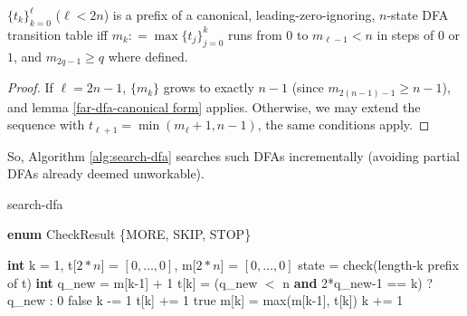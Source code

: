 \begin{corollary}\normalfont
  $\{t_k\}_{k=0}^\ell$ ($\ell<2n$) is a prefix of a canonical, leading-zero-ignoring, $n$-state DFA transition table iff
  $m_k \mathrel{\mathop:}= \max\{t_j\}_{j=0}^k$ runs from $0$ to $m_{\ell-1}<n$ in steps of $0$ or $1$, and $m_{2q-1}\ge q$ where defined.
\end{corollary}
\begin{proof}
If $\ell=2n-1$, $\{m_k\}$ grows to exactly $n-1$ (since $m_{2(n-1)-1}\ge n-1$), and lemma \ref{far-dfa-canonical form} applies.
Otherwise, we may extend the sequence with $t_{\ell+1}=\min(m_\ell+1,n-1)$, the same conditions apply.
\end{proof}

So, Algorithm \ref{alg:search-dfa} searches such DFAs incrementally (avoiding partial DFAs already deemed unworkable).

\begin{algorithm}
  \caption{{\sc search-dfa}}\label{alg:search-dfa}

  \begin{algorithmic}[1]
    \State \textbf{enum} CheckResult \{MORE, SKIP, STOP\}
    \Statex

    \State \textbf{int} k = 1, t[$2*n$] = $[0,\ldots,0]$, m[$2*n$] = $[0,\ldots,0]$
    \Loop
    \State state = check(length-k prefix of t)
    \State \textbf{int} q\_new = m[k-1] + 1
    \State t[k] = (q\_new $<$ \textrm{n} \textbf{and} 2*q\_new-1 == k) ? q\_new : 0
    \Repeat
    \Return false
    \EndIf
    \State k -= 1
    \State t[k] += 1
    \Else\;\Return true
    \EndIf
    \State m[k] = max(m[k-1], t[k])
    \State k += 1
    \EndLoop
    \EndProcedure

  \end{algorithmic}
\end{algorithm}


